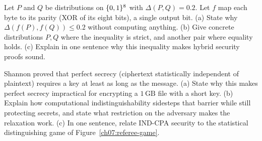 \begin{exercise}
\label{ch07:ex-dpi}
Let $P$ and $Q$ be distributions on $\{0,1\}^{8}$ with $\Delta(P, Q) = 0.2$. Let $f$ map each byte to its parity (XOR of its eight bits), a single output bit. (a) State why $\Delta(f(P), f(Q)) \le 0.2$ without computing anything. (b) Give concrete distributions $P, Q$ where the inequality is strict, and another pair where equality holds. (c) Explain in one sentence why this inequality makes hybrid security proofs sound.
\end{exercise}

\begin{exercise}
\label{ch07:ex-ind}
Shannon proved that perfect secrecy (ciphertext statistically independent of plaintext) requires a key at least as long as the message. (a) State why this makes perfect secrecy impractical for encrypting a $1\,\text{GB}$ file with a short key. (b) Explain how computational indistinguishability sidesteps that barrier while still protecting secrets, and state what restriction on the adversary makes the relaxation work. (c) In one sentence, relate IND-CPA security to the statistical distinguishing game of Figure~\ref{ch07:referee-game}.
\end{exercise}
